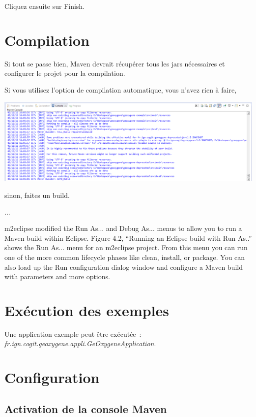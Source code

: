 \bigskip

\noindent
Cliquez ensuite sur Finish.


\section{Compilation}

Si tout se passe bien, Maven devrait récupérer tous les jars nécessaires et configurer le projet pour la compilation. 

Si vous utilisez l'option de compilation automatique, vous n'avez rien à faire, 

\begin{center}
\includegraphics[width=0.5\linewidth]{../../resources/images/guide_installation/geoxygeneAutoBuild.png}
\end{center}

sinon, faites un build.

...

m2eclipse modified the Run As... and Debug As... menus to allow you to run a Maven build within Eclipse. Figure 4.2, “Running
an Eclipse build with Run As..” shows the Run As... menu for an m2eclipse project. From this menu you can run one of the more
common lifecycle phases like clean, install, or package. You can also load up the Run configuration dialog window and configure
a Maven build with parameters and more options.




\section{Exécution des exemples}
Une application exemple peut \^etre exécutée~: \emph{fr.ign.cogit.geoxygene.appli.GeOxygeneApplication}.


\section{Configuration}


\subsection{Activation de la console Maven}

